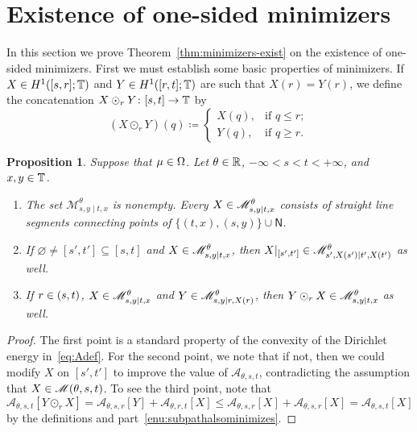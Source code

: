 \documentclass[10pt,a4paper]{amsart}
\newcommand*\ssN{\mathsf{N}}
\newcommand*\scM{\mathscr{M}}
\newcommand*\TT{\mathbb{T}}
\newcommand*\RR{\mathbb{R}}
\newcommand{\clA}{\mathcal{A}}
\renewcommand*{\to}{\mathchoice{\longrightarrow}{\rightarrow}{\rightarrow}{\rightarrow}}
\let\oldin\in
\renewcommand{\in}{\mathchoice{\oldin}{\oldin}{\,\oldin\,}{\,\oldin\,}}
\numberwithin{equation}{section}
\newtheorem{prop}[theo]{Proposition}
\theoremstyle{definition}\newtheorem{defi}[theo]{Definition}
\begin{document}
\section{Existence of one-sided minimizers}
In this section we prove Theorem~\ref{thm:minimizers-exist} on the existence of one-sided minimizers. First we must establish some basic properties of minimizers. If $X\in H^{1}([s,r];\TT)$ and $Y\in H^{1}([r,t];\TT)$ are such that $X(r)=Y(r)$, we define the concatenation $X\odot_{r}Y\colon[s,t]\to\TT$ by
\begin{equation}\label{eq:odotdef}
(X\odot_{r}Y)(q)\coloneqq
\begin{cases}
X(q), & \text{if }q\le r;\\
Y(q), & \text{if }q\ge r.
\end{cases}
\end{equation}

\begin{prop}\label{prop:basicproperties}
Suppose that $\mu\in\Omega$. Let $\theta\in\RR$, $-\infty<s<t<+\infty$, and $x,y\in\TT$.
\begin{enumerate}
\item \label{enu:straightlines}
The set $\scM_{s,y\mid t,x}^{\theta}$ is nonempty. Every $X\in\scM_{s,y\mid t,x}^{\theta}$ consists of straight line segments connecting points of $\{(t,x),(s,y)\}\cup\ssN$.
\item \label{enu:subpathalsominimizes}
If $\varnothing\ne[s',t']\subseteq[s,t]$ and $X\in\scM_{s,y\mid t,x}^{\theta}$, then $X|_{[s',t']}\in\scM_{s',X(s')\mid t',X(t')}^{\theta}$ as well.
\item \label{enu:pathsurgery}
If $r\in(s,t)$, $X\in\scM_{s,y\mid t,x}^{\theta}$ and $Y\in\scM_{s,y\mid r,X(r)}^{\theta}$, then $Y\odot_{r}X\in\scM_{s,y\mid t,x}^{\theta}$ as well.
\end{enumerate}
\end{prop}

\begin{proof}
The first point is a standard property of the convexity of the Dirichlet energy in~\eqref{eq:Adef}. For the second point, we note that if not, then we could modify $X$ on $[s',t']$ to improve the value of $\clA_{\theta,s,t}$, contradicting the assumption that $X\in\scM(\theta,s,t)$. To see the third point, note that
\[
\clA_{\theta,s,t}[Y\odot_{r}X]=\clA_{\theta,s,r}[Y]+\clA_{\theta,r,t}[X]\le\clA_{\theta,s,r}[X]+\clA_{\theta,s,r}[X]=\clA_{\theta,s,t}[X]
\]
by the definitions and part~\eqref{enu:subpathalsominimizes}.
\end{proof}
\end{document}
